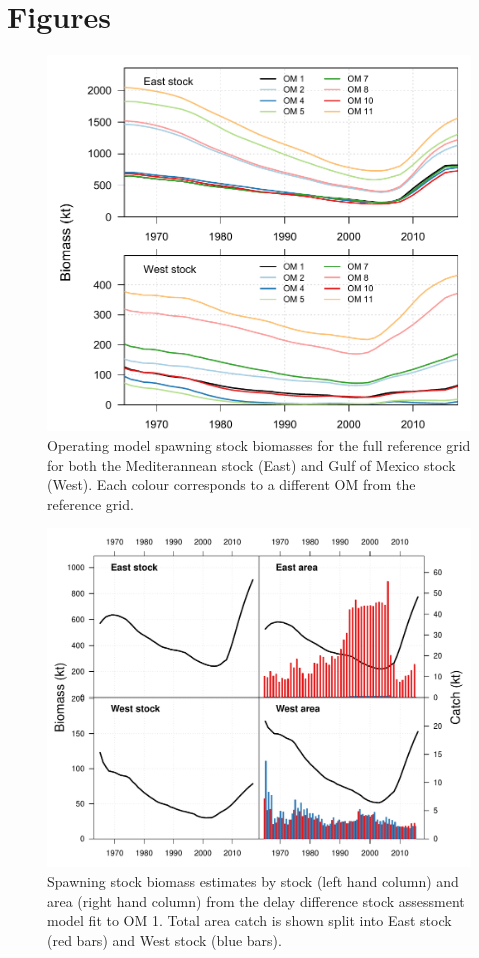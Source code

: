 \documentclass[]{article}
\begin{document}
\hypertarget{figures}{%
\section{Figures}\label{figures}}

\begin{figure}[htb]

{\centering \includegraphics[width=0.9\linewidth]{data/OMbiomass} 

}

\caption{Operating model spawning stock biomasses for the full reference grid for both the Mediterannean stock (East) and Gulf of Mexico stock (West). Each colour corresponds to a different OM from the reference grid.}\label{fig:heatMapPlot}
\end{figure}

\begin{figure}[htb]

{\centering \includegraphics[width=0.9\linewidth]{data/AM/1/biomass} 

}

\caption{Spawning stock biomass estimates by stock (left hand column) and area (right hand column) from the delay difference stock assessment model fit to OM 1. Total area catch is shown split into East stock (red bars) and West stock (blue bars).}\label{fig:amBiomassPlot}
\end{figure}
\end{document}
